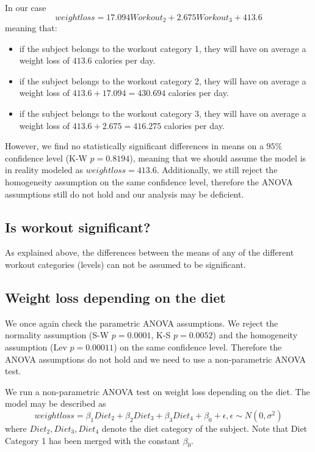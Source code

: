\documentclass[12pt, a4paper]{article}
\begin{document}
	In our case
	$$
	weightloss = 17.094 Workout_2 + 2.675 Workout_3 + 413.6
	$$
	meaning that:
	
	\begin{itemize}
		\item if the subject belongs to the workout category 1, they will have on average a weight loss of $413.6$ calories per day.
		
		\item if the subject belongs to the workout category 2, they will have on average a weight loss of $413.6 + 17.094 = 430.694$ calories per day.
		
		\item if the subject belongs to the workout category 3, they will have on average a weight loss of $413.6 + 2.675 = 416.275$ calories per day.
	\end{itemize}
	
	However, we find no statistically significant differences in means on a $95\%$ confidence level (K-W $p=0.8194$), meaning that we should assume the model is in reality modeled as $weightloss = 413.6$. Additionally, we still reject the  homogeneity assumption on the same confidence level, therefore the ANOVA assumptions still do not hold and our analysis may be deficient.
	
	
	\subsection{Is workout significant?}
	
	As explained above, the differences between the means of any of the different workout categories (levels) can not be assumed to be significant.
	
	
	\subsection{Weight loss depending on the diet}
	
	We once again check the parametric ANOVA assumptions. We reject the normality assumption (S-W $p=0.0001$, K-S $p=0.0052$) and the homogeneity assumption (Lev $p=0.00011$) on the same confidence level. Therefore the ANOVA assumptions do not hold and we need to use a non-parametric ANOVA test.
	
	We run a non-parametric ANOVA test on weight loss depending on the diet. The model may be described as 
	$$
	weightloss = \beta_1 Diet_2 + \beta_2 Diet_3 + \beta_3 Diet_4 + \beta_0 + \epsilon, \epsilon \sim N(0, \sigma^2)
	$$
	where $Diet_2, Diet_3, Diet_4$ denote the diet category of the subject. Note that Diet Category 1 has been merged with the constant $\beta_0$.
	
\end{document}
